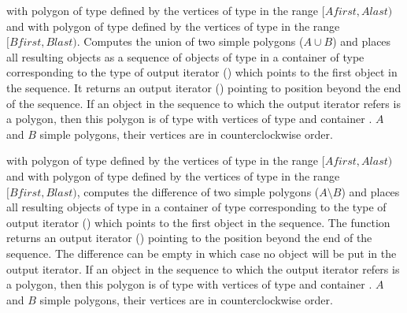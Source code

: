 {with polygon  of type  defined by the
 vertices of type 
  in the range 
 $[Afirst,Alast)$
 and with polygon  of type  defined by the
 vertices of type  in the range $[Bfirst,Blast)$.
 Computes the union of two simple polygons ($A \cup B$) and places all
resulting objects as a sequence of objects of type 
in a container of type corresponding to the type of
 output iterator () 
 which points to the first object in the
sequence.
It returns an output iterator () 
pointing to position beyond the end of the sequence.
 If an object in the sequence to which the output iterator refers is a
 polygon, then this polygon is of type  with 
 vertices of type  and container 
 .
 \ccPrecond $A$ and $B$ simple polygons, their vertices are in
counterclockwise order.
}


{with polygon  of type  defined by the
 vertices of type 
  in the range 
 $[Afirst,Alast)$
 and with polygon  of type  defined by the
 vertices of type  in the range $[Bfirst,Blast)$,
 computes the difference of two simple polygons ($A \setminus B$) and places
 all resulting objects of type  in a container of
type corresponding to the type of 
 output iterator () 
 which points to the first object in the
sequence.
The function returns an output iterator () 
pointing to the position beyond the end of the sequence.
The difference can be empty in which case no object will be put
in the output iterator.
 If an object in the sequence to which the output iterator refers is a
 polygon, then this polygon is of type  with 
 vertices of type  and container 
 .
 \ccPrecond $A$ and $B$ simple polygons, their vertices are in
counterclockwise order.
}


